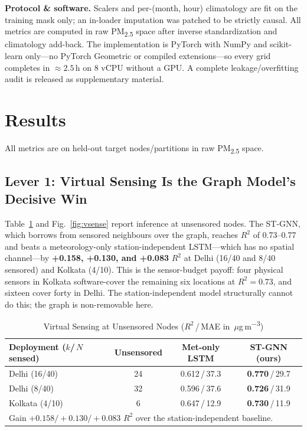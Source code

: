 \documentclass[journal]{IEEEtran}
\newcommand{\pmf}{PM\textsubscript{2.5}\xspace}
\newcommand{\ugm}{\,$\mu$g\,m\textsuperscript{$-3$}\xspace}
\newcommand{\Rtwo}{\ensuremath{R^{2}}\xspace}
\begin{document}
\textbf{Protocol \& software.} Scalers and per-(month, hour) climatology are fit on the training mask only; an in-loader imputation was patched to be strictly causal. All metrics are computed in raw \pmf space after inverse standardization and climatology add-back. The implementation is PyTorch with NumPy and scikit-learn only---no PyTorch Geometric or compiled extensions---so every grid completes in ${\approx}2.5$\,h on 8 vCPU without a GPU. A complete leakage/overfitting audit is released as supplementary material.

\section{Results}\label{sec:results}
All metrics are on held-out target nodes/partitions in raw \pmf space.

\subsection{Lever 1: Virtual Sensing Is the Graph Model's Decisive Win}
Table~\ref{tab:vsense} and Fig.~\ref{fig:vsense} report inference at unsensored nodes. The ST-GNN, which borrows from sensored neighbours over the graph, reaches \Rtwo of 0.73--0.77 and beats a meteorology-only station-independent LSTM---which has no spatial channel---by \textbf{+0.158, +0.130, and +0.083} \Rtwo at Delhi (16/40 and 8/40 sensored) and Kolkata (4/10). This is the sensor-budget payoff: four physical sensors in Kolkata software-cover the remaining six locations at \Rtwo${=}0.73$, and sixteen cover forty in Delhi. The station-independent model structurally cannot do this; the graph is non-removable here.

\begin{table}[!t]
\caption{Virtual Sensing at Unsensored Nodes (\Rtwo\,/\,MAE in \ugm)}
\label{tab:vsense}
\centering
\footnotesize
\begin{tabular}{lccc}
\toprule
Deployment ($k$/\,$N$ sensed) & Unsensored & Met-only LSTM & ST-GNN (ours) \\
\midrule
Delhi (16/40)  & 24 & 0.612\,/\,37.3 & \textbf{0.770}\,/\,29.7 \\
Delhi (8/40)   & 32 & 0.596\,/\,37.6 & \textbf{0.726}\,/\,31.9 \\
Kolkata (4/10) & \phantom{0}6 & 0.647\,/\,12.9 & \textbf{0.730}\,/\,11.9 \\
\bottomrule
\multicolumn{4}{l}{\footnotesize Gain $+0.158/+0.130/+0.083$ \Rtwo over the station-independent baseline.}
\end{tabular}
\end{table}
\end{document}
